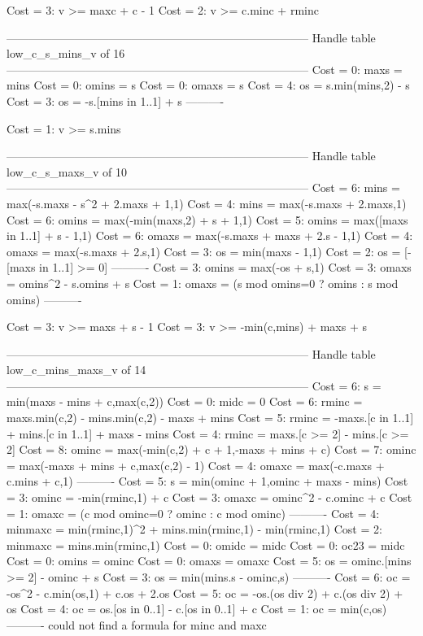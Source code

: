 Cost =  3:  v >= maxc + c - 1
Cost =  2:  v >= c.minc + rminc

--------------------------------------------------------------------------------
Handle table low_c_s_mins_v of 16
--------------------------------------------------------------------------------
Cost =  0:  maxs  = mins
Cost =  0:  omins = s
Cost =  0:  omaxs = s
Cost =  4:  os    = s.min(mins,2) - s
Cost =  3:  os    = -s.[mins in 1..1] + s
----------

Cost =  1:  v >= s.mins

--------------------------------------------------------------------------------
Handle table low_c_s_maxs_v of 10
--------------------------------------------------------------------------------
Cost =  6:  mins  = max(-s.maxs - s^2 + 2.maxs + 1,1)
Cost =  4:  mins  = max(-s.maxs + 2.maxs,1)
Cost =  6:  omins = max(-min(maxs,2) + s + 1,1)
Cost =  5:  omins = max([maxs in 1..1] + s - 1,1)
Cost =  6:  omaxs = max(-s.maxs + maxs + 2.s - 1,1)
Cost =  4:  omaxs = max(-s.maxs + 2.s,1)
Cost =  3:  os    = min(maxs - 1,1)
Cost =  2:  os    = [-[maxs in 1..1] >= 0]
----------
Cost =  3:  omins = max(-os + s,1)
Cost =  3:  omaxs = omins^2 - s.omins + s
Cost =  1:  omaxs = (s mod omins=0 ? omins : s mod omins)
----------

Cost =  3:  v >= maxs + s - 1
Cost =  3:  v >= -min(c,mins) + maxs + s

--------------------------------------------------------------------------------
Handle table low_c_mins_maxs_v of 14
--------------------------------------------------------------------------------
Cost =  6:  s       = min(maxs - mins + c,max(c,2))
Cost =  0:  midc    = 0
Cost =  6:  rminc   = maxs.min(c,2) - mins.min(c,2) - maxs + mins
Cost =  5:  rminc   = -maxs.[c in 1..1] + mins.[c in 1..1] + maxs - mins
Cost =  4:  rminc   = maxs.[c >= 2] - mins.[c >= 2]
Cost =  8:  ominc   = max(-min(c,2) + c + 1,-maxs + mins + c)
Cost =  7:  ominc   = max(-maxs + mins + c,max(c,2) - 1)
Cost =  4:  omaxc   = max(-c.maxs + c.mins + c,1)
----------
Cost =  5:  s       = min(ominc + 1,ominc + maxs - mins)
Cost =  3:  ominc   = -min(rminc,1) + c
Cost =  3:  omaxc   = ominc^2 - c.ominc + c
Cost =  1:  omaxc   = (c mod ominc=0 ? ominc : c mod ominc)
----------
Cost =  4:  minmaxc = min(rminc,1)^2 + mins.min(rminc,1) - min(rminc,1)
Cost =  2:  minmaxc = mins.min(rminc,1)
Cost =  0:  omidc   = midc
Cost =  0:  oc23    = midc
Cost =  0:  omins   = ominc
Cost =  0:  omaxs   = omaxc
Cost =  5:  os      = ominc.[mins >= 2] - ominc + s
Cost =  3:  os      = min(mins.s - ominc,s)
----------
Cost =  6:  oc      = -os^2 - c.min(os,1) + c.os + 2.os
Cost =  5:  oc      = -os.(os div 2) + c.(os div 2) + os
Cost =  4:  oc      = os.[os in 0..1] - c.[os in 0..1] + c
Cost =  1:  oc      = min(c,os)
----------
could not find a formula for minc and maxc


